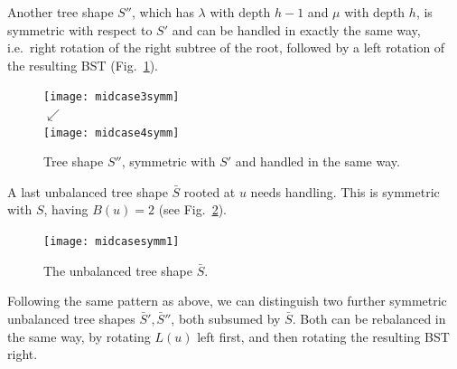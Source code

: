 \documentclass[a4paper]{book}
\theoremstyle{changebreak}                %
\begin{document}
Another tree shape $S''$, which has $\lambda$ with depth $h-1$ and
$\mu$ with depth $h$, is symmetric with respect to $S'$ and can be
handled in exactly the same way, i.e.~right rotation of the right
subtree of the root, followed by a left rotation of the resulting
BST (Fig.~\ref{f:lrsymm}).
\begin{figure}[!ht]
\begin{center}
\texttt{[image: midcase3symm]} \\ [-1em] $\swarrow$ \\ [-0.5em]
\texttt{[image: midcase4symm]}
\end{center}
\caption{Tree shape $S''$, symmetric with $S'$ and handled in the same
way.}
\label{f:lrsymm}
\end{figure}

A last unbalanced tree shape $\bar{S}$ rooted at $u$ needs
handling. This is symmetric with $S$, having $B(u)=2$ (see
Fig.~\ref{f:lrsymm2}).
\begin{figure}[!ht]
\begin{center}
\texttt{[image: midcasesymm1]}
\end{center}
\caption{The unbalanced tree shape $\bar{S}$.}
\label{f:lrsymm2}
\end{figure}
Following the same pattern as above, we can distinguish two further
symmetric unbalanced tree
shapes
$\bar{S}',\bar{S}''$, both subsumed by $\bar{S}$. Both can be
rebalanced in the same way, by rotating $L(u)$ left first, and then
rotating the resulting BST right.
\end{document}
